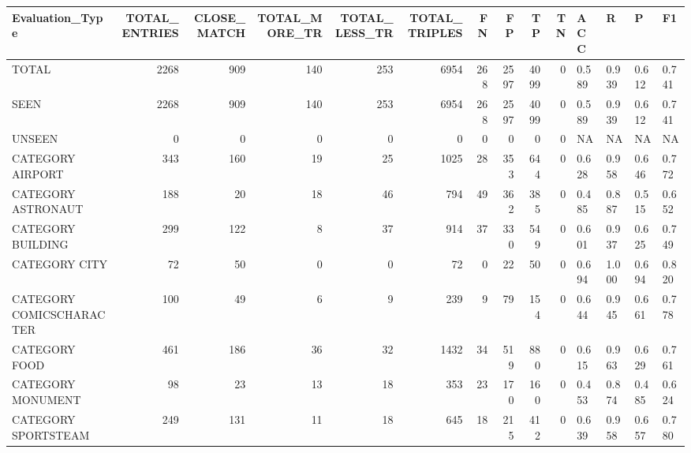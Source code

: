 \begin{tabular}{lrrrrrrrrrllll}
\hline
 Evaluation\_Type          &   TOTAL\_ENTRIES &   CLOSE\_MATCH &   TOTAL\_MORE\_TR &   TOTAL\_LESS\_TR &   TOTAL\_TRIPLES &   FN &   FP &   TP &   TN & ACC   & R     & P     & F1    \\
\hline
 TOTAL                    &            2268 &           909 &             140 &             253 &            6954 &  268 & 2597 & 4099 &    0 & 0.589 & 0.939 & 0.612 & 0.741 \\
 SEEN                     &            2268 &           909 &             140 &             253 &            6954 &  268 & 2597 & 4099 &    0 & 0.589 & 0.939 & 0.612 & 0.741 \\
 UNSEEN                   &               0 &             0 &               0 &               0 &               0 &    0 &    0 &    0 &    0 & NA    & NA    & NA    & NA    \\
 CATEGORY AIRPORT         &             343 &           160 &              19 &              25 &            1025 &   28 &  353 &  644 &    0 & 0.628 & 0.958 & 0.646 & 0.772 \\
 CATEGORY ASTRONAUT       &             188 &            20 &              18 &              46 &             794 &   49 &  362 &  385 &    0 & 0.485 & 0.887 & 0.515 & 0.652 \\
 CATEGORY BUILDING        &             299 &           122 &               8 &              37 &             914 &   37 &  330 &  549 &    0 & 0.601 & 0.937 & 0.625 & 0.749 \\
 CATEGORY CITY            &              72 &            50 &               0 &               0 &              72 &    0 &   22 &   50 &    0 & 0.694 & 1.000 & 0.694 & 0.820 \\
 CATEGORY COMICSCHARACTER &             100 &            49 &               6 &               9 &             239 &    9 &   79 &  154 &    0 & 0.644 & 0.945 & 0.661 & 0.778 \\
 CATEGORY FOOD            &             461 &           186 &              36 &              32 &            1432 &   34 &  519 &  880 &    0 & 0.615 & 0.963 & 0.629 & 0.761 \\
 CATEGORY MONUMENT        &              98 &            23 &              13 &              18 &             353 &   23 &  170 &  160 &    0 & 0.453 & 0.874 & 0.485 & 0.624 \\
 CATEGORY SPORTSTEAM      &             249 &           131 &              11 &              18 &             645 &   18 &  215 &  412 &    0 & 0.639 & 0.958 & 0.657 & 0.780 \\

\end{tabular}
